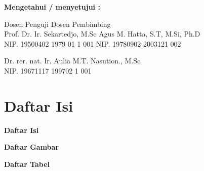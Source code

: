 \documentclass[12pt]{article}
\begin{document}
	\vspace{20pt}
	
	\begin{center}
		\textbf{Mengetahui / menyetujui :}
	\end{center}

	
	\begin{center}
		Dosen Penguji \hspace{150pt} Dosen Pembimbing \\
		Prof. Dr. Ir. Sekartedjo, M.Sc \hspace{75pt} Agus M. Hatta, S.T, M.Si, Ph.D \\
		NIP. 19500402 1979 01 1 001 \hspace{85pt} NIP. 19780902 2003121 002 \\
	\end{center}

	\vspace{100pt}	
	
	\begin{flushleft}
		\hspace{50pt} Dr. rer. nat. Ir. Aulia M.T. Nasution., M.Sc \\
		\hspace{75pt} NIP. 19671117 199702 1 001
	\end{flushleft}

\newpage
\thispagestyle{plain}
\mbox{}

\newpage
	
	\section{Daftar Isi}

	\begin{center}
		\textbf{{\large Daftar Isi}}
	\end{center}
	
	\tableofcontents

\newpage
\thispagestyle{plain}
\mbox{}

\newpage

\begin{center}
	\textbf{{\large Daftar Gambar}}
\end{center}

\newpage
\thispagestyle{plain}
\mbox{}

\newpage

\begin{center}
	\textbf{{\large Daftar Tabel}}
\end{center}

\newpage
\thispagestyle{plain}
\mbox{}
	
\end{document}
